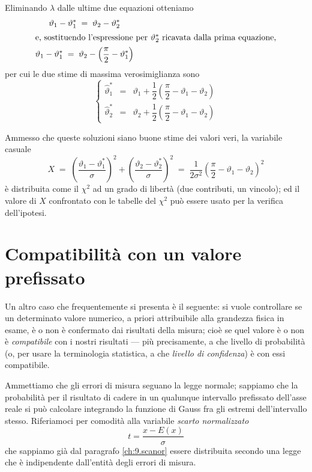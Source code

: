 Eliminando $\lambda$ dalle ultime due equazioni otteniamo
\begin{gather*}
  \vartheta_1 - \vartheta_1^* \; = \; \vartheta_2 -
  \vartheta_2^* \\
  \intertext{e, sostituendo l'espressione per
    $\vartheta_2^*$ ricavata dalla prima equazione,}
  \vartheta_1 - \vartheta_1^* \; = \; \vartheta_2 - \left(
    \frac{\pi}{2} - \vartheta_1^* \right)
\end{gather*}
per cui le due stime di massima verosimiglianza sono
\begin{equation*}
  \left\{
    \begin{array}{ccl}
      \hat \vartheta_1^* & = & \vartheta_1 + \dfrac{1}{2}
      \left( \dfrac{\pi}{2} - \vartheta_1 - \vartheta_2
      \right) \\[2.5ex]
      \hat \vartheta_2^* & = & \vartheta_2 + \dfrac{1}{2}
      \left( \dfrac{\pi}{2} - \vartheta_1 - \vartheta_2
      \right)
    \end{array}
  \right.
\end{equation*}

Ammesso che queste soluzioni siano buone stime dei valori
veri, la variabile casuale
\begin{equation*}
  X \; = \; \left( \frac{ \vartheta_1 -
      \vartheta_1^*}{\sigma} \right)^2 + \left( \frac{
      \vartheta_2 - \vartheta_2^*}{\sigma} \right)^2 \;
  = \; \frac{1}{2 \sigma^2} \left( \frac{\pi}{2} -
    \vartheta_1 - \vartheta_2 \right)^2
\end{equation*}
\`e distribuita come il $\chi^2$ ad un grado di libert\`a
(due contributi, un vincolo); ed il valore di $X$
confrontato con le tabelle del $\chi^2$ pu\`o essere usato
per la verifica dell'ipotesi.

\section{Compatibilit\`a con un valore prefissato}%
Un altro caso che frequentemente si presenta \`e il
seguente: si vuole controllare se un determinato valore
numerico, a priori attribuibile alla grandezza fisica in
esame, \`e o non \`e confermato dai risultati della misura;
cio\`e se quel valore \`e o non \`e \emph{compatibile} con i
nostri risultati --- pi\`u precisamente, a che livello di
probabilit\`a (o, per usare la terminologia statistica, a
che \emph{livello di confidenza}) \`e con essi compatibile.

Ammettiamo che gli errori di misura seguano la legge
normale; sappiamo che la probabilit\`a per il risultato di
cadere in un qualunque intervallo prefissato dell'asse reale
si pu\`o calcolare integrando la funzione di Gauss fra gli
estremi dell'intervallo stesso.  Riferiamoci per comodit\`a
alla variabile \emph{scarto normalizzato}
\begin{equation*}
  t = \frac{x - E(x)}{\sigma}
\end{equation*}
che sappiamo gi\`a dal paragrafo \ref{ch:9.scanor} essere
distribuita secondo una legge che \`e indipendente
dall'entit\`a degli errori di misura.

